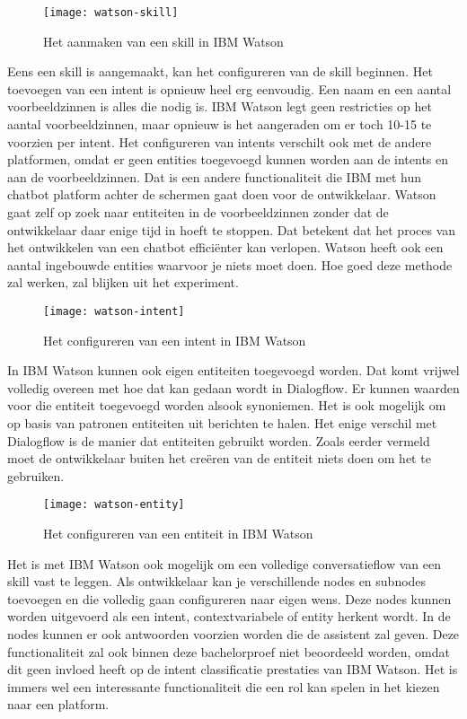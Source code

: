 \begin{figure}[H]
    \label{fig:watson-skill}
    \centering
    \texttt{[image: watson-skill]}
    \caption{Het aanmaken van een skill in IBM Watson}
\end{figure}

Eens een skill is aangemaakt, kan het configureren van de skill beginnen. Het toevoegen van een intent is opnieuw heel erg eenvoudig. Een naam en een aantal voorbeeldzinnen is alles die nodig is. IBM Watson legt geen restricties op het aantal voorbeeldzinnen, maar opnieuw is het aangeraden om er toch 10-15 te voorzien per intent. Het configureren van intents verschilt ook met de andere platformen, omdat er geen entities toegevoegd kunnen worden aan de intents en aan de voorbeeldzinnen. Dat is een andere functionaliteit die IBM met hun chatbot platform achter de schermen gaat doen voor de ontwikkelaar. Watson gaat zelf op zoek naar entiteiten in de voorbeeldzinnen zonder dat de ontwikkelaar daar enige tijd in hoeft te stoppen. Dat betekent dat het proces van het ontwikkelen van een chatbot efficiënter kan verlopen. Watson heeft ook een aantal ingebouwde entities waarvoor je niets moet doen. Hoe goed deze methode zal werken, zal blijken uit het experiment.

\begin{figure}[H]
    \label{fig:watson-intent}
    \centering
    \texttt{[image: watson-intent]}
    \caption{Het configureren van een intent in IBM Watson}
\end{figure}

In IBM Watson kunnen ook eigen entiteiten toegevoegd worden. Dat komt vrijwel volledig overeen met hoe dat kan gedaan wordt in Dialogflow. Er kunnen waarden voor die entiteit toegevoegd worden alsook synoniemen. Het is ook mogelijk om op basis van patronen entiteiten uit berichten te halen. Het enige verschil met Dialogflow is de manier dat entiteiten gebruikt worden. Zoals eerder vermeld moet de ontwikkelaar buiten het creëren van de entiteit niets doen om het te gebruiken.

\begin{figure}[H]
    \label{fig:watson-entity}
    \centering
    \texttt{[image: watson-entity]}
    \caption{Het configureren van een entiteit in IBM Watson}
\end{figure}

Het is met IBM Watson ook mogelijk om een volledige conversatieflow van een skill vast te leggen. Als ontwikkelaar kan je verschillende nodes en subnodes toevoegen en die volledig gaan configureren naar eigen wens. Deze nodes kunnen worden uitgevoerd als een intent, contextvariabele of entity herkent wordt. In de nodes kunnen er ook antwoorden voorzien worden die de assistent zal geven. Deze functionaliteit zal ook binnen deze bachelorproef niet beoordeeld worden, omdat dit geen invloed heeft op de intent classificatie prestaties van IBM Watson. Het is immers wel een interessante functionaliteit die een rol kan spelen in het kiezen naar een platform.

